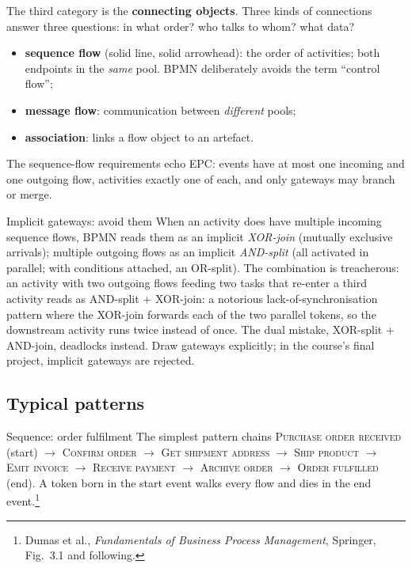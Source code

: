 The third category is the \textbf{connecting objects}. Three kinds of connections answer three questions: in what order? who talks to whom? what data?
\begin{itemize}
  \item \textbf{sequence flow} (solid line, solid arrowhead): the order of activities; both endpoints in the \emph{same} pool. BPMN deliberately avoids the term ``control flow'';
  \item \textbf{message flow}: communication between \emph{different} pools;
  \item \textbf{association}: links a flow object to an artefact.
\end{itemize}
The sequence-flow requirements echo EPC: events have at most one incoming and one outgoing flow, activities exactly one of each, and only gateways may branch or merge.

\begin{notebox}{Implicit gateways: avoid them}
When an activity does have multiple incoming sequence flows, BPMN reads them as an implicit \emph{XOR-join} (mutually exclusive arrivals); multiple outgoing flows as an implicit \emph{AND-split} (all activated in parallel; with conditions attached, an OR-split). The combination is treacherous: an activity with two outgoing flows feeding two tasks that re-enter a third activity reads as AND-split + XOR-join: a notorious lack-of-synchronisation pattern where the XOR-join forwards each of the two parallel tokens, so the downstream activity runs twice instead of once. The dual mistake, XOR-split + AND-join, deadlocks instead. Draw gateways explicitly; in the course's final project, implicit gateways are rejected.
\end{notebox}

\subsection{Typical patterns}

\begin{examplebox}{Sequence: order fulfilment}
The simplest pattern chains \textsc{Purchase order received} (start) $\to$ \textsc{Confirm order} $\to$ \textsc{Get shipment address} $\to$ \textsc{Ship product} $\to$ \textsc{Emit invoice} $\to$ \textsc{Receive payment} $\to$ \textsc{Archive order} $\to$ \textsc{Order fulfilled} (end). A token born in the start event walks every flow and dies in the end event.\footnote{Dumas et al., \emph{Fundamentals of Business Process Management}, Springer, Fig.~3.1 and following.}
\end{examplebox}

